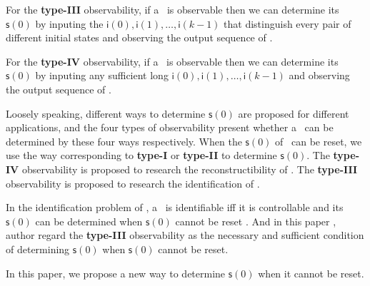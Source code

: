  For the {\bf type-III} observability, if a \BCN\ is observable then we can determine its $\mathsf{s}(0)$ by inputing the $\mathsf{i}(0),\mathsf{i}(1),\ldots,\mathsf{i}(k-1)$ that distinguish every pair of different initial states and observing the output sequence of \BCN.

For the {\bf type-IV} observability, if a \BCN\ is observable then we can determine its $\mathsf{s}(0)$ by inputing any sufficient long $\mathsf{i}(0),\mathsf{i}(1),\ldots,\mathsf{i}(k-1)$ and observing the output sequence of \BCN.

Loosely speaking, different ways to determine $\mathsf{s}(0)$ are proposed for different applications, and the four types of observability present whether a \BCN\ can be determined by these four ways respectively. When the $\mathsf{s}(0)$ of \BCN\ can be reset, we use the way corresponding to {\bf type-I} or {\bf type-II} to determine $\mathsf{s}(0)$. The {\bf type-IV} observability is proposed to research the reconstructibility of \BCN. The {\bf type-III} observability is proposed to research the identification of \BCN. 

In the identification problem of \BCNs, a \BCN\ is identifiable iff it is controllable and its $\mathsf{s}(0)$ can be determined when $\mathsf{s}(0)$ cannot be reset \cite{Cheng2011Identification}. And in this paper \cite{Cheng2011Identification}, author regard the {\bf type-III} observability as the necessary and sufficient condition of determining $\mathsf{s}(0)$ when $\mathsf{s}(0)$ cannot be reset. %

In this paper, we propose a new way to determine $\mathsf{s}(0)$ when it cannot be reset.%


